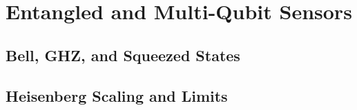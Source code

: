\chapter{Entangled and Multi-Qubit Sensors}
\section{Bell, GHZ, and Squeezed States}
\section{Heisenberg Scaling and Limits}

